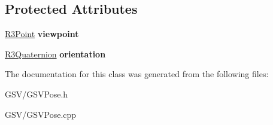 \subsection*{Protected Attributes}
\begin{DoxyCompactItemize}
\item 
\hyperlink{class_r3_point}{R3\+Point} {\bfseries viewpoint}\hypertarget{class_g_s_v_pose_aaed6ef8149b84b7da675028187c87b0f}{}\label{class_g_s_v_pose_aaed6ef8149b84b7da675028187c87b0f}

\item 
\hyperlink{class_r3_quaternion}{R3\+Quaternion} {\bfseries orientation}\hypertarget{class_g_s_v_pose_a8b51594a232f1240f2cf52c665340194}{}\label{class_g_s_v_pose_a8b51594a232f1240f2cf52c665340194}

\end{DoxyCompactItemize}


The documentation for this class was generated from the following files\+:\begin{DoxyCompactItemize}
\item 
G\+S\+V/G\+S\+V\+Pose.\+h\item 
G\+S\+V/G\+S\+V\+Pose.\+cpp\end{DoxyCompactItemize}
